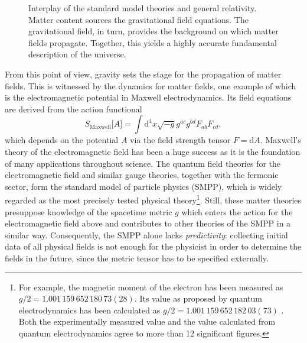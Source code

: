 \begin{figure}
  \begin{center}
  \end{center}
  \caption{Interplay of the standard model theories and general relativity. Matter content sources the gravitational field equations. The gravitational field, in turn, provides the background on which matter fields propagate. Together, this yields a highly accurate fundamental description of the universe.}
  \label{figure_smpp_gr}
\end{figure}

From this point of view, gravity sets the stage for the propagation of matter fields. This is witnessed by the dynamics for matter fields, one example of which is the electromagnetic potential in Maxwell electrodynamics. Its field equations are derived from the action functional
\begin{equation*}
  S_\text{Maxwell}\lbrack A\rbrack = \int\mathrm d^4x \sqrt{-g} g^{ac} g^{bd} F_{ab} F_{cd},
\end{equation*}
which depends on the potential $A$ via the field strength tensor $F = \mathrm dA$. Maxwell's theory of the electromagnetic field has been a huge success as it is the foundation of many applications throughout science. The quantum field theories for the electromagnetic field and similar gauge theories, together with the fermonic sector, form the standard model of particle physics (SMPP), which is widely regarded as the most precisely tested physical theory\footnote{For example, the magnetic moment of the electron has been measured as $g/2 = 1.001\,159\,652\,180\,73(28)$. \cite{Hanneke_2011} Its value as proposed by quantum electrodynamics has been calculated as $g/2 = 1.001\,159\,652\,182\,03(73)$ \cite{Aoyama_2017}. Both the experimentally measured value and the value calculated from quantum electrodynamics agree to more than 12 significant figures.}. Still, these matter theories presuppose knowledge of the spacetime metric $g$ which enters the action for the electromagnetic field above and contributes to other theories of the SMPP in a similar way. Consequently, the SMPP alone lacks \emph{predictivity}: collecting initial data of all physical fields is not enough for the physicist in order to determine the fields in the future, since the metric tensor has to be specified externally. 

